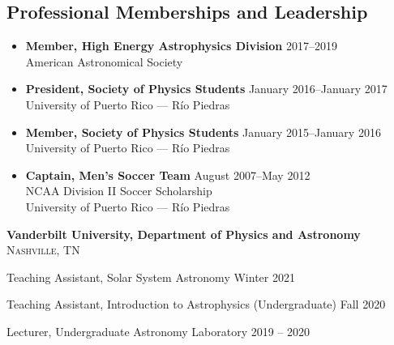 \documentclass[11pt,a4paper]{article}
\begin{document}
\subsection*{Professional Memberships and Leadership}

\begin{itemize}[leftmargin=0em, itemsep=0.5em, label={}]
    \item \textbf{Member, High Energy Astrophysics Division} \hfill 2017–2019\\
    American Astronomical Society
    
    \item \textbf{President, Society of Physics Students} \hfill January 2016–January 2017\\
    University of Puerto Rico — Río Piedras
    
    \item \textbf{Member, Society of Physics Students} \hfill January 2015–January 2016\\
    University of Puerto Rico — Río Piedras
    
    \item \textbf{Captain, Men's Soccer Team} \hfill August 2007–May 2012\\
    NCAA Division II Soccer Scholarship\\
    University of Puerto Rico — Río Piedras
\end{itemize}

\spacedhrule{0.5em}{-0.4em}



\headedsection
{\textbf{Vanderbilt University, Department of Physics and Astronomy}}
{\textsc{Nashville, TN}}
{%
    \headedsubsection
    {Teaching Assistant, Solar System Astronomy}
    {Winter 2021}
    {}
    
    \headedsubsection
    {Teaching Assistant, Introduction to Astrophysics (Undergraduate)}
    {Fall 2020}
    {}
    
    \headedsubsection
    {Lecturer, Undergraduate Astronomy Laboratory}
    {2019 -- 2020}
    {}
}

\spacedhrule{0.5em}{-0.4em}


\end{document}
